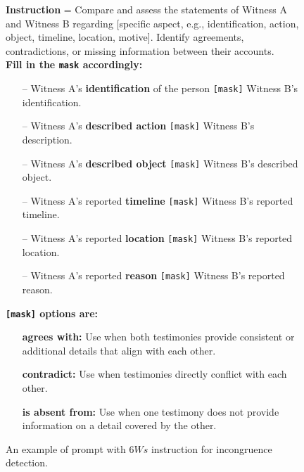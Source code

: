 \begin{figure}[t]
    \begin{tcolorbox}[width=\columnwidth,title=,colupper=black]\scriptsize
        \textbf{Instruction} = Compare and assess the statements of Witness A and Witness B regarding [specific aspect, e.g., identification, action, object, timeline, location, motive]. Identify agreements, contradictions, or missing information between their accounts. \\
        \textbf{Fill in the \texttt{mask} accordingly:}
        \begin{itemize}[itemsep=-2pt]
            \item[--] Witness A's \textbf{identification} of the person \texttt{[mask]} Witness B's identification.
            \item[--] Witness A's \textbf{described action} \texttt{[mask]} Witness B's description.
            \item[--] Witness A's \textbf{described object} \texttt{[mask]} Witness B's described object.
            \item[--] Witness A's reported \textbf{timeline} \texttt{[mask]} Witness B's reported timeline.
            \item[--] Witness A's reported \textbf{location} \texttt{[mask]} Witness B's reported location.
            \item[--] Witness A's reported \textbf{reason} \texttt{[mask]} Witness B's reported reason.
        \end{itemize}
        \textbf{\texttt{[mask]} options are:}
        \begin{itemize}[itemsep=-2pt]
            \item[ ] \textbf{agrees with:} Use when both testimonies provide consistent or additional details that align with each other.
            \item[ ] \textbf{contradict:} Use when testimonies directly conflict with each other.
            \item[ ] \textbf{is absent from:} Use when one testimony does not provide information on a detail covered by the other.
        \end{itemize}
    \end{tcolorbox}  
    \vspace{-3mm}
    \caption{An example of prompt with $6Ws$ instruction for incongruence detection.}
    \label{fig:prompt:6w}
\end{figure}